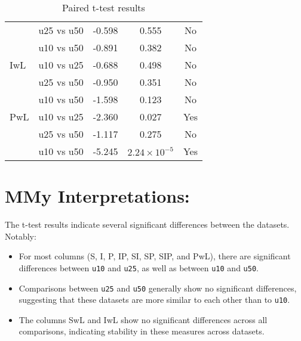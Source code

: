 \documentclass{article}
\begin{document}
\begin{table}[ht!]
\begin{tabular}{lcccc}
    & u25 vs u50 & -0.598 & 0.555 & No \\
    & u10 vs u50 & -0.891 & 0.382 & No \\
IwL & u10 vs u25 & -0.688 & 0.498 & No \\
    & u25 vs u50 & -0.950 & 0.351 & No \\
    & u10 vs u50 & -1.598 & 0.123 & No \\
PwL & u10 vs u25 & -2.360 & 0.027 & Yes \\
    & u25 vs u50 & -1.117 & 0.275 & No \\
    & u10 vs u50 & -5.245 & $2.24 \times 10^{-5}$ & Yes \\
\bottomrule
\end{tabular}
\caption{Paired t-test results}\label{tab:paired-ttests}
\end{table}

\section{MMy Interpretations: }
The t-test results indicate several significant differences between the datasets. Notably:

\begin{itemize}
    \item For most columns (S, I, P, IP, SI, SP, SIP, and PwL), there are significant differences between \texttt{u10} and \texttt{u25}, as well as between \texttt{u10} and \texttt{u50}.
    \item Comparisons between \texttt{u25} and \texttt{u50} generally show no significant differences, suggesting that these datasets are more similar to each other than to \texttt{u10}.
    \item The columns SwL and IwL show no significant differences across all comparisons, indicating stability in these measures across datasets.
\end{itemize}
\end{document}
